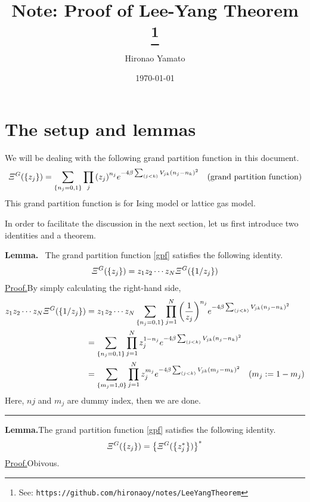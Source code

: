\documentclass[aps, 12pt]{revtex4-2}
\begin{document}
\title{Note: Proof of Lee-Yang Theorem \footnote{See: \texttt{https://github.com/hironaoy/notes/LeeYangTheorem}}}
\author{Hironao Yamato}

\date{\today}
\maketitle
\section{The setup and lemmas}
We will be dealing with the following grand partition function in this document.
\begin{align}
  \varXi^{{G}}(\qty{z_j}) = \sum_{\qty{n_j = 0, 1}}\prod_{j}\qty(z_{j})^{n_j}e^{-4\beta\sum_{(j<k)}V_{jk}(n_j - n_k)^2} \quad \text{(grand partition function)}\label{gpf}
\end{align}
This grand partition function is for Ising model or lattice gas model.

In order to facilitate the discussion in the next section, let us first introduce two identities and a theorem.

\noindent
\textbf{Lemma.} \, The grand partition function \eqref{gpf} satisfies the following identity.
\begin{align}
  \varXi^G(\qty{z_j}) = z_1z_2 \cdots z_N\varXi^G(\qty{1/z_j})
\end{align}
\underline{Proof.}\quad By simply calculating the right-hand side, 
\begin{align}
  z_1z_2 \cdots z_N \varXi^G(\qty{1/z_j}) &= z_1z_2 \cdots z_N \sum_{\qty{n_j = 0, 1}} \prod_{j = 1}^N\qty(\frac{1}{z_j})^{n_j} e^{-4\beta\sum_{(j<k)}V_{jk}(n_j - n_k)^2} \nonumber \\
  &= \sum_{\qty{n_j = 0, 1}} \prod_{j = 1}^N z_j^{1 - n_j} e^{-4\beta\sum_{(j<k)}V_{jk}(n_j - n_k)^2} \nonumber \\
  &= \sum_{\qty{m_j = 1, 0}} \prod_{j = 1}^N z_j^{m_j} e^{-4\beta\sum_{(j<k)}V_{jk}(m_j - m_k)^2} \quad \qty(m_j := 1 - m_j)
\end{align}
Here, $nj$ and $m_j$ are dummy index, then we are done. \hfill \rule{1.5mm}{3.5mm}

\noindent
\textbf{Lemma.}\quad The grand partition function \eqref{gpf} satisfies the following identity.
\begin{align}
  \varXi^G(\qty{z_j}) = \qty{\varXi^G(\qty{z_j^*})}^*
\end{align}
\underline{Proof.}\quad Obivous.
\end{document}
